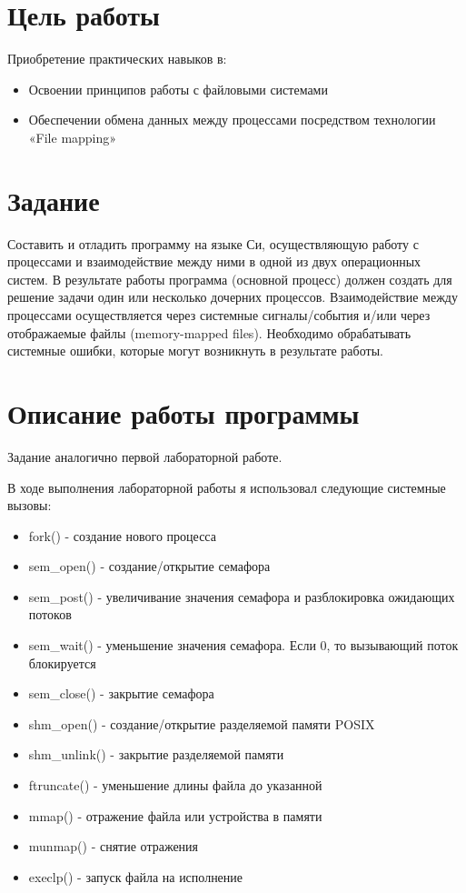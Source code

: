 \documentclass[a4paper, 12pt]{article}
\begin{document}
\section{Цель работы}
Приобретение практических навыков в:
\begin{itemize}
    \item Освоении принципов работы с файловыми системами
    \item Обеспечении обмена данных между процессами посредством технологии «File mapping»
\end{itemize}

\section{Задание}
Составить и отладить программу на языке Си, осуществляющую работу с процессами и взаимодействие между ними в одной из двух операционных систем. В результате работы программа (основной процесс) должен создать для решение задачи один или несколько дочерних процессов. Взаимодействие между процессами осуществляется через системные сигналы/события и/или через отображаемые файлы (memory-mapped files).
Необходимо обрабатывать системные ошибки, которые могут возникнуть в результате работы.

\section{Описание работы программы}
Задание аналогично первой лабораторной работе.

В ходе выполнения лабораторной работы я использовал следующие системные вызовы:
\begin{itemize}
    \item fork() - создание нового процесса
    \item sem\_open() - создание/открытие семафора
    \item sem\_post() - увеличивание значения семафора и разблокировка ожидающих потоков
    \item sem\_wait() - уменьшение значения семафора. Если 0, то вызывающий поток блокируется 
    \item sem\_close() - закрытие семафора
    \item shm\_open() - создание/открытие разделяемой памяти POSIX
    \item shm\_unlink() - закрытие разделяемой памяти
    \item ftruncate() - уменьшение длины файла до указанной  
    \item mmap() - отражение файла или устройства в памяти
    \item munmap() - снятие отражения
    \item execlp() - запуск файла на исполнение
\end{itemize}
\end{document}
